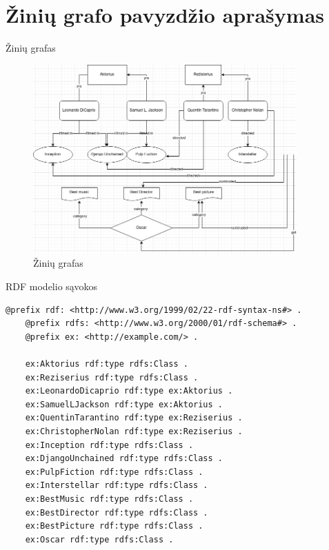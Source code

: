 \documentclass[10pt]{beamer}
\begin{document}
\section{Žinių grafo pavyzdžio aprašymas}

\begin{frame}[fragile]{Žinių grafas}
    \begin{figure}[htbp]
          \centering
          \includegraphics[width=0.9\textwidth]{img/grafas.png}
          \caption{Žinių grafas}
          \label{fig:vertex}
    \end{figure}
\end{frame}

\begin{frame}[fragile]{RDF modelio sąvokos}
    \begin{lstlisting}[captionpos=b, caption=RDF modelio sąvokos, label=lst:sparql,
   basicstyle=\ttfamily\scriptsize,frame=single]
    @prefix rdf: <http://www.w3.org/1999/02/22-rdf-syntax-ns#> .
    @prefix rdfs: <http://www.w3.org/2000/01/rdf-schema#> .
    @prefix ex: <http://example.com/> .
    
    ex:Aktorius rdf:type rdfs:Class .
    ex:Reziserius rdf:type rdfs:Class .
    ex:LeonardoDicaprio rdf:type ex:Aktorius .
    ex:SamuelLJackson rdf:type ex:Aktorius .
    ex:QuentinTarantino rdf:type ex:Reziserius .
    ex:ChristopherNolan rdf:type ex:Reziserius .
    ex:Inception rdf:type rdfs:Class .
    ex:DjangoUnchained rdf:type rdfs:Class .
    ex:PulpFiction rdf:type rdfs:Class .
    ex:Interstellar rdf:type rdfs:Class .
    ex:BestMusic rdf:type rdfs:Class .
    ex:BestDirector rdf:type rdfs:Class .
    ex:BestPicture rdf:type rdfs:Class .
    ex:Oscar rdf:type rdfs:Class .
    \end{lstlisting}
\end{frame}
\end{document}
